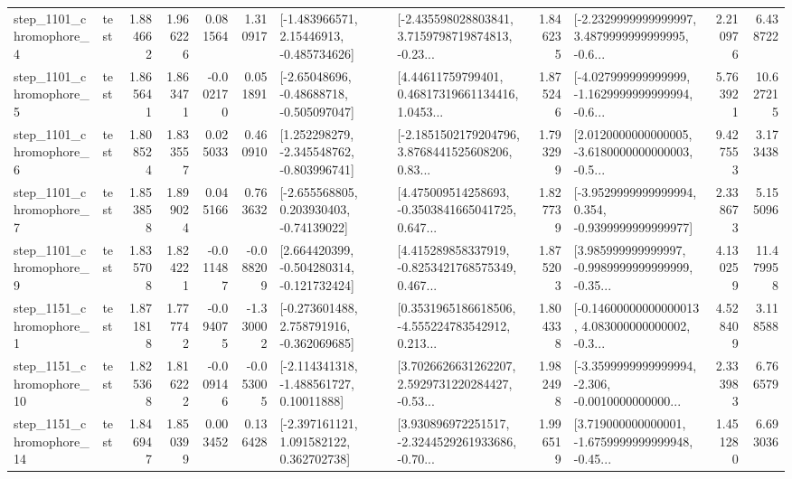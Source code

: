 \begin{tabular}{llrrrrllrlrr}
  step\_1101\_chromophore\_4 &      test &      1.884662 &    1.966226 &      0.081564 &  1.310917 &    [-1.483966571, 2.15446913, -0.485734626] &  [-2.435598028803841, 3.7159798719874813, -0.23... &       1.846235 &  [-2.2329999999999997, 3.4879999999999995, -0.6... &            2.210976 &          6.438722 \\
  step\_1101\_chromophore\_5 &      test &      1.865641 &    1.863471 &     -0.002170 &  0.051891 &    [-2.65048696, -0.48688718, -0.505097047] &  [4.44611759799401, 0.46817319661134416, 1.0453... &       1.875246 &  [-4.027999999999999, -1.1629999999999994, -0.6... &            5.763921 &         10.627215 \\
  step\_1101\_chromophore\_6 &      test &      1.808524 &    1.833557 &      0.025033 &  0.460910 &   [1.252298279, -2.345548762, -0.803996741] &  [-2.1851502179204796, 3.8768441525608206, 0.83... &       1.793299 &  [2.0120000000000005, -3.6180000000000003, -0.5... &            9.427553 &          3.173438 \\
  step\_1101\_chromophore\_7 &      test &      1.853858 &    1.899024 &      0.045166 &  0.763632 &    [-2.655568805, 0.203930403, -0.74139022] &  [4.475009514258693, -0.3503841665041725, 0.647... &       1.827739 &  [-3.9529999999999994, 0.354, -0.9399999999999977] &            2.338673 &          5.155096 \\
  step\_1101\_chromophore\_9 &      test &      1.835708 &    1.824221 &     -0.011487 & -0.088209 &   [2.664420399, -0.504280314, -0.121732424] &  [4.415289858337919, -0.8253421768575349, 0.467... &       1.875203 &  [3.985999999999997, -0.9989999999999999, -0.35... &            4.130259 &         11.479958 \\
  step\_1151\_chromophore\_1 &      test &      1.871818 &    1.777742 &     -0.094075 & -1.330002 &   [-0.273601488, 2.758791916, -0.362069685] &  [0.3531965186618506, -4.555224783542912, 0.213... &       1.804338 &  [-0.14600000000000013, 4.083000000000002, -0.3... &            4.528409 &          3.118588 \\
 step\_1151\_chromophore\_10 &      test &      1.825368 &    1.816222 &     -0.009146 & -0.053005 &    [-2.114341318, -1.488561727, 0.10011888] &  [3.7026626631262207, 2.5929731220284427, -0.53... &       1.982498 &  [-3.3599999999999994, -2.306, -0.0010000000000... &            2.333983 &          6.766579 \\
 step\_1151\_chromophore\_14 &      test &      1.846947 &    1.850399 &      0.003452 &  0.136428 &    [-2.397161121, 1.091582122, 0.362702738] &  [3.930896972251517, -2.3244529261933686, -0.70... &       1.996519 &  [3.719000000000001, -1.6759999999999948, -0.45... &            1.451280 &          6.693036 \\

\end{tabular}
